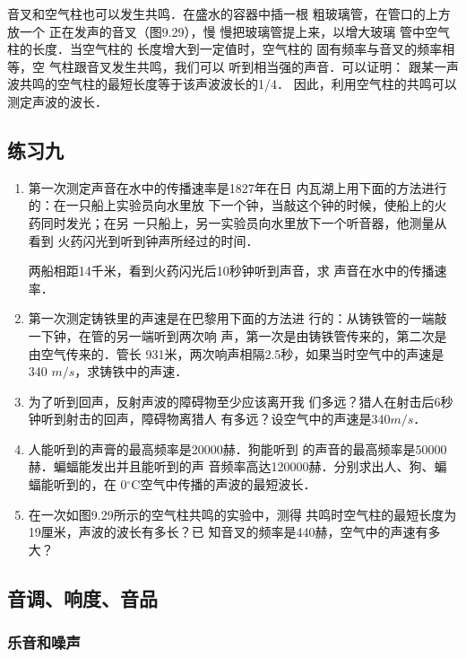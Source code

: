 音叉和空气柱也可以发生共鸣．在盛水的容器中插一根
粗玻璃管，在管口的上方放一个
正在发声的音叉（图9.29），慢
慢把玻璃管提上来，以增大玻璃
管中空气柱的长度．当空气柱的
长度增大到一定值时，空气柱的
固有频率与音叉的频率相等，空
气柱跟音叉发生共鸣，我们可以
听到相当强的声音．可以证明：
跟某一声波共鸣的空气柱的最短长度等于该声波波长的1/4．
因此，利用空气柱的共鸣可以测定声波的波长．


\subsection*{练习九}

\begin{enumerate}
    \item 第一次测定声音在水中的传播速率是1827年在日
          内瓦湖上用下面的方法进行的：在一只船上实验员向水里放
          下一个钟，当敲这个钟的时候，使船上的火药同时发光；在另
          一只船上，另一实验员向水里放下一个听音器，他测量从看到
          火药闪光到听到钟声所经过的时间．

          两船相距14千米，看到火药闪光后10秒钟听到声音，求
          声音在水中的传播速率．

    \item 第一次测定铸铁里的声速是在巴黎用下面的方法进
          行的：从铸铁管的一端敲一下钟，在管的另一端听到两次响
          声，第一次是由铸铁管传来的，第二次是由空气传来的．管长
          931米，两次响声相隔2.5秒，如果当时空气中的声速是340
          $\si{m/s}$，求铸铁中的声速．

    \item 为了听到回声，反射声波的障碍物至少应该离开我
          们多远？猎人在射击后6秒钟听到射击的回声，障碍物离猎人
          有多远？设空气中的声速是340$\si{m/s}$．
    \item 人能听到的声膏的最高频率是20000赫．狗能听到
          的声音的最高频率是50000赫．蝙蝠能发出并且能听到的声
          音频率高达120000赫．分别求出人、狗、蝙蝠能听到的，在
          0$^{\circ}$C空气中传播的声波的最短波长．
    \item 在一次如图9.29所示的空气柱共鸣的实验中，测得
          共鸣时空气柱的最短长度为19厘米，声波的波长有多长？已
          知音叉的频率是440赫，空气中的声速有多大？


\end{enumerate}

\subsection{音调、响度、音品}
\subsubsection{乐音和噪声}

